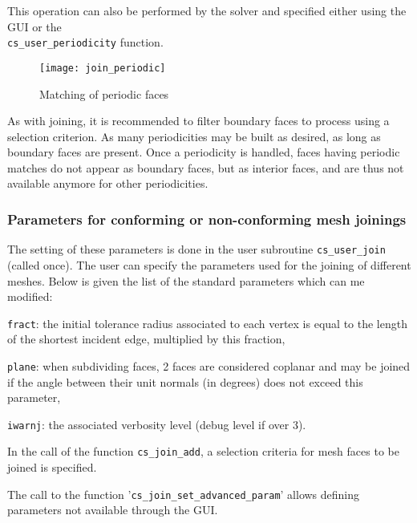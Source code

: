 {{{This operation can also be performed by the solver and specified
either using the GUI or the \\\texttt{cs\_user\_periodicity} function.

\begin{figure}[!hp]
\centerline{
\texttt{[image: join\_periodic]}}
\caption{Matching of periodic faces
\label{fig:join_periodic}}
\end{figure}

As with joining, it is recommended to filter boundary faces to process
using a selection criterion. As many periodicities may be built as desired,
as long as boundary faces are present. Once a periodicity is handled,
faces having periodic matches do not appear as boundary faces, but as
interior faces, and are thus not available anymore for other
periodicities.

\subsubsection{Parameters for conforming or non-conforming mesh joinings}

The setting of these parameters is done in the user subroutine \texttt{cs\_user\_join} (called once). The user can specify the parameters used for the joining of different meshes. Below is given the list of the standard parameters which can me modified:
\begin{list}{-}{}
\item \texttt{fract}: the initial tolerance radius associated to each vertex is equal to the length of the shortest incident edge, multiplied by this fraction,
\item \texttt{plane}: when subdividing faces, 2 faces are considered coplanar and may be joined if the angle between their unit normals (in degrees) does not exceed this parameter,
\item \texttt{iwarnj}: the associated verbosity level (debug level if over 3).
\end{list}
In the call of the function \texttt{cs\_join\_add}, a selection criteria for
mesh faces to be joined is specified.

The call to the function '\texttt{cs\_join\_set\_advanced\_param}' allows defining parameters not available through the GUI.

}}}
